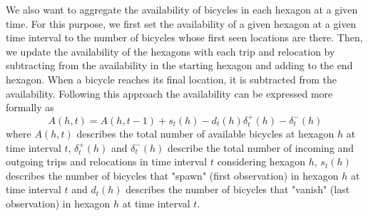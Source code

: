 We also want to aggregate the availability of bicycles in each hexagon at a given time.
For this purpose, we first set the availability of a given hexagon at a given time interval to the number of bicycles whose first seen locations are there.
Then, we update the availability of the hexagons with each trip and relocation by subtracting from the availability in the starting hexagon and adding to the end hexagon.
When a bicycle reaches its final location, it is subtracted from the availability.
Following this approach the availability can be expressed more formally as
\[A(h, t) = A(h, t-1) + s_t(h) - d_t(h) \delta_t^+(h) - \delta_t^-(h)\]
where \(A(h, t)\) describes the total number of available bicycles at hexagon \(h\) at time interval \(t\),
\(\delta_t^+(h)\) and \(\delta_t^-(h)\) describe the total number of incoming and outgoing trips and relocations in time interval \(t\) considering hexagon \(h\),
\(s_t(h)\) describes the number of bicycles that "spawn" (first observation) in hexagon \(h\) at time interval \(t\) and
\(d_t(h)\) describes the number of bicycles that "vanish" (last observation) in hexagon \(h\) at time interval \(t\).

